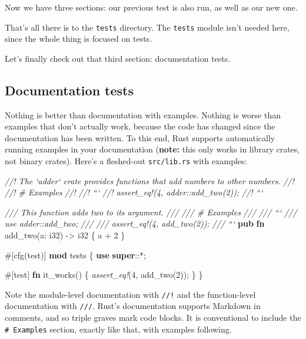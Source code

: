 \documentclass[a4paper,]{book}
\newenvironment{Shaded}{\begin{snugshade}}{\end{snugshade}}
\newcommand{\KeywordTok}[1]{\textcolor[rgb]{0.13,0.29,0.53}{\textbf{{#1}}}}
\newcommand{\DataTypeTok}[1]{\textcolor[rgb]{0.13,0.29,0.53}{{#1}}}
\newcommand{\DecValTok}[1]{\textcolor[rgb]{0.00,0.00,0.81}{{#1}}}
\newcommand{\CommentTok}[1]{\textcolor[rgb]{0.56,0.35,0.01}{\textit{{#1}}}}
\newcommand{\PreprocessorTok}[1]{\textcolor[rgb]{0.56,0.35,0.01}{\textit{{#1}}}}
\newcommand{\AttributeTok}[1]{\textcolor[rgb]{0.77,0.63,0.00}{{#1}}}
\newcommand{\NormalTok}[1]{{#1}}
\begin{document}
Now we have three sections: our previous test is also run, as well as
our new one.

That's all there is to the \texttt{tests} directory. The \texttt{tests}
module isn't needed here, since the whole thing is focused on tests.

Let's finally check out that third section: documentation tests.

\subsection{Documentation tests}\label{documentation-tests}

Nothing is better than documentation with examples. Nothing is worse
than examples that don't actually work, because the code has changed
since the documentation has been written. To this end, Rust supports
automatically running examples in your documentation (\textbf{note:}
this only works in library crates, not binary crates). Here's a
fleshed-out \texttt{src/lib.rs} with examples:

\begin{Shaded}
\begin{Highlighting}[]
\CommentTok{//! The `adder` crate provides functions that add numbers to other numbers.}
\CommentTok{//!}
\CommentTok{//! # Examples}
\CommentTok{//!}
\CommentTok{//! ```}
\CommentTok{//! assert_eq!(4, adder::add_two(2));}
\CommentTok{//! ```}

\CommentTok{/// This function adds two to its argument.}
\CommentTok{///}
\CommentTok{/// # Examples}
\CommentTok{///}
\CommentTok{/// ```}
\CommentTok{/// use adder::add_two;}
\CommentTok{///}
\CommentTok{/// assert_eq!(4, add_two(2));}
\CommentTok{/// ```}
\KeywordTok{pub} \KeywordTok{fn} \NormalTok{add_two(a: }\DataTypeTok{i32}\NormalTok{) -> }\DataTypeTok{i32} \NormalTok{\{}
    \NormalTok{a + }\DecValTok{2}
\NormalTok{\}}

\AttributeTok{#[}\NormalTok{cfg}\AttributeTok{(}\NormalTok{test}\AttributeTok{)]}
\KeywordTok{mod} \NormalTok{tests \{}
    \KeywordTok{use} \KeywordTok{super}\NormalTok{::*;}

    \AttributeTok{#[}\NormalTok{test}\AttributeTok{]}
    \KeywordTok{fn} \NormalTok{it_works() \{}
        \PreprocessorTok{assert_eq!}\NormalTok{(}\DecValTok{4}\NormalTok{, add_two(}\DecValTok{2}\NormalTok{));}
    \NormalTok{\}}
\NormalTok{\}}
\end{Highlighting}
\end{Shaded}

Note the module-level documentation with \texttt{//!} and the
function-level documentation with \texttt{///}. Rust's documentation
supports Markdown in comments, and so triple graves mark code blocks. It
is conventional to include the \texttt{\#\ Examples} section, exactly
like that, with examples following.
\end{document}
